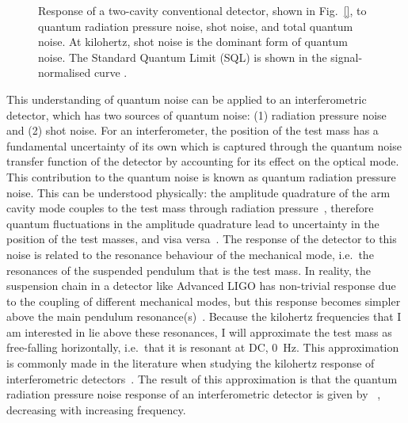 
\begin{figure}
	\centering
	\caption{Response of a two-cavity conventional detector, shown in Fig.~\ref{}, to quantum radiation pressure noise, shot noise, and total quantum noise. At kilohertz, shot noise is the dominant form of quantum noise. The Standard Quantum Limit (SQL) is shown in the signal-normalised curve .}
	\label{fig:simplifed_QN_response_conventional}
\end{figure}

This understanding of quantum noise can be applied to an interferometric detector, which has two sources of quantum noise: (1) radiation pressure noise and (2) shot noise. 
For an interferometer, the position of the test mass has a fundamental uncertainty of its own which is captured through the quantum noise transfer function of the detector by accounting for its effect on the optical mode. This contribution to the quantum noise is known as quantum radiation pressure noise. 
This can be understood physically: the amplitude quadrature of the arm cavity mode couples to the test mass through radiation pressure~\cite{}, therefore quantum fluctuations in the amplitude quadrature lead to uncertainty in the position of the test masses, and visa versa~\cite{Danilishin?}. The response of the detector to this noise is related to the resonance behaviour of the mechanical mode, i.e.\ the resonances of the suspended pendulum that is the test mass. In reality, the suspension chain in a detector like Advanced LIGO has non-trivial response due to the coupling of different mechanical modes, but this response becomes simpler above the main pendulum resonance(s)~\cite{}. Because the kilohertz frequencies that I am interested in lie above these resonances, I will approximate the test mass as free-falling horizontally, i.e.\ that it is resonant at DC, $0$~Hz. This approximation is commonly made in the literature when studying the kilohertz response of interferometric detectors~\cite{}. The result of this approximation is that the quantum radiation pressure noise response of an interferometric detector is given by ~\cite{}, decreasing with increasing frequency.

